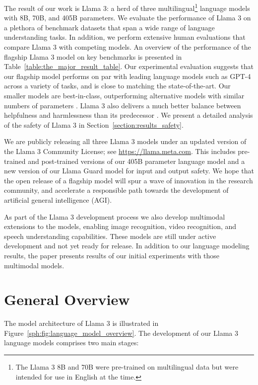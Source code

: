 The result of our work is Llama 3: a herd of three multilingual\footnote{The Llama 3 8B and 70B were pre-trained on multilingual data but were intended for use in English at the time.} language models with 8B, 70B, and 405B parameters. We evaluate the performance of Llama 3 on a plethora of benchmark datasets that span a wide range of language understanding tasks. In addition, we perform extensive human evaluations that compare Llama 3 with competing models. An overview of the performance of the flagship Llama 3 model on key benchmarks is presented in Table~\ref{table:the_major_result_table}.
Our experimental evaluation suggests that our flagship model performs on par with leading language models such as GPT-4 \citep{openai2023gpt4} across a variety of tasks, and is close to matching the state-of-the-art. Our smaller models are best-in-class, outperforming alternative models with similar numbers of parameters \citep{bai2023qwen,jiang2023mistral}. Llama 3 also delivers a much better balance between helpfulness and harmlessness than its predecessor \citep{touvron2023llama2}. We present a detailed analysis of the safety of Llama 3 in Section~\ref{section:results_safety}.


We are publicly releasing all three Llama 3 models under an updated version of the Llama 3 Community License; see \url{https://llama.meta.com}. 
This includes pre-trained and post-trained versions of our 405B parameter language model and a new version of our Llama Guard model \citep{inan2023llamaguard} for input and output safety. We hope that the open release of a flagship model will spur a wave of innovation in the research community, and accelerate a responsible path towards the development of artificial general intelligence (AGI).

As part of the Llama 3 development process we also develop multimodal extensions to the models, enabling image recognition, video recognition, and speech understanding capabilities. These models are still under active development and not yet ready for release. In addition to our language modeling results, the paper presents results of our initial experiments with those multimodal models.

\section{General Overview}
\label{section:overview}
The model architecture of Llama 3 is illustrated in Figure~\ref{sph:fig:language_model_overview}.
The development of our Llama 3 language models comprises two main stages:

